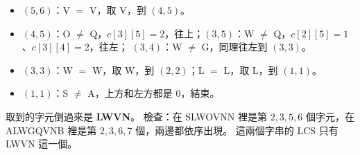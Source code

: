 \begin{pastsoln}
\begin{itemize}
\item $(5, 6)$：V $=$ V，取 V，到 $(4, 5)$。
\item $(4, 5)$：O $\ne$ Q，$c[3][5] = 2$，往上；$(3, 5)$：W $\ne$ Q，$c[2][5] = 1$、$c[3][4] = 2$，往左；
$(3, 4)$：W $\ne$ G，同理往左到 $(3, 3)$。
\item $(3, 3)$：W $=$ W，取 W，到 $(2, 2)$；L $=$ L，取 L，到 $(1, 1)$。
\item $(1, 1)$：S $\ne$ A，上方和左方都是 $0$，結束。
\end{itemize}
取到的字元倒過來是 \textbf{LWVN}。 檢查：在 SLWOVNN 裡是第 $2, 3, 5, 6$ 個字元，在 ALWGQVNB 裡是第
$2, 3, 6, 7$ 個，兩邊都依序出現。 這兩個字串的 LCS 只有 LWVN 這一個。
\end{pastsoln}
